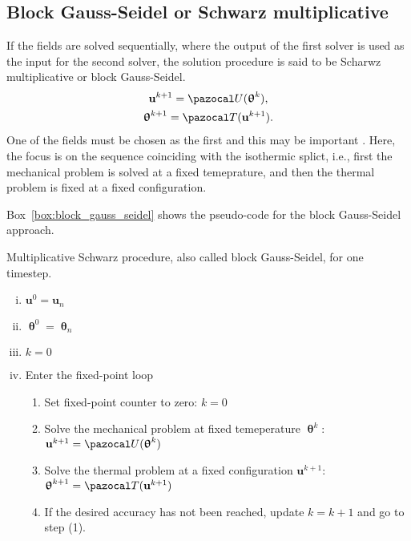 \subsection{Block Gauss-Seidel or Schwarz multiplicative}

If the fields are solved sequentially, where the output of the first solver is used as the input for the second solver, the solution procedure is said to be Scharwz multiplicative or block Gauss-Seidel.
\begin{gather}
\mathbf u^{k+1}  = \pazocal U(\bm \uptheta^k),\\
\bm \uptheta^{k+1} = \pazocal T(\mathbf u^{k+1}).
\end{gather}
One of the fields must be chosen as the first and this may be important \citep{joosten_analysis_2009}.
Here, the focus is on the sequence coinciding with the isothermic splict, i.e., first the mechanical problem is solved at a fixed temeprature, and then the thermal problem is fixed at a fixed configuration.

Box~\ref{box:block_gauss_seidel} shows the pseudo-code for the block Gauss-Seidel approach.

\begin{framedbox}[htb]
  \caption{Multiplicative Schwarz procedure, also called block Gauss-Seidel, for one timestep.}
  \label{box:block_gauss_seidel}
  \begin{center}
    \begin{minipage}{0.9\textwidth}
    \begin{enumerate}[(i)]
    \item \(\mathbf u^0 = \mathbf u_{n}\)
    \item \(\bm \uptheta^0 = \bm \uptheta_n\)
    \item \(k=0\)
    \item Enter the fixed-point loop
    \begin{enumerate}[(1)]
      \item Set fixed-point counter to zero: \(k=0\)
      \item Solve the mechanical problem at fixed temeperature \(\bm \uptheta^k\): \(\mathbf u^{k+1} = \pazocal U(\bm \uptheta^k)\)
      \item Solve the thermal problem at a fixed configuration \(\mathbf u^{k+1}\): \(\bm \uptheta^{k+1} = \pazocal T(\mathbf u^{k+1})\)
      \item If the desired accuracy has not been reached, update \(k=k+1\) and go to step (1).

    \end{enumerate}
    \end{enumerate}
    \end{minipage}
  \end{center}
\end{framedbox}

